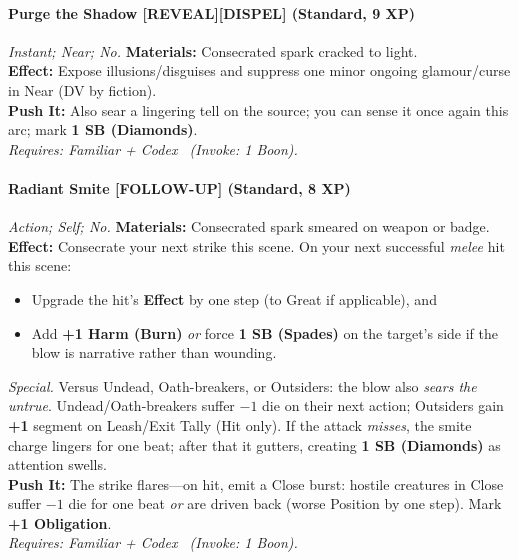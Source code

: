 \paragraph{Purge the Shadow \textnormal{[REVEAL][DISPEL]} (Standard, 9 XP)} \emph{Instant; Near; No.}
\textbf{Materials:} Consecrated spark cracked to light.\\
\textbf{Effect:} Expose illusions/disguises and suppress one minor ongoing glamour/curse in Near (DV by fiction).\\
\textbf{Push It:} Also sear a lingering tell on the source; you can sense it once again this arc; mark \textbf{1 SB (Diamonds)}.\\
\emph{Requires: Familiar + Codex \ (\textit{Invoke:} 1 Boon).}

\paragraph{Radiant Smite \textnormal{[FOLLOW-UP]} (Standard, 8 XP)} \emph{Action; Self; No.}
\textbf{Materials:} Consecrated spark smeared on weapon or badge.\\
\textbf{Effect:} Consecrate your next strike this scene. On your next successful \emph{melee} hit this scene:
\begin{itemize}
  \item Upgrade the hit's \textbf{Effect} by one step (to Great if applicable), and
  \item Add \textbf{+1 Harm (Burn)} \emph{or} force \textbf{1 SB (Spades)} on the target's side if the blow is narrative rather than wounding.
\end{itemize}
\textit{Special.} Versus Undead, Oath-breakers, or Outsiders: the blow also \emph{sears the untrue}. Undead/Oath-breakers suffer \(-1\) die on their next action; Outsiders gain \textbf{+1} segment on Leash/Exit Tally (Hit only). If the attack \emph{misses}, the smite charge lingers for one beat; after that it gutters, creating \textbf{1 SB (Diamonds)} as attention swells.\\
\textbf{Push It:} The strike flares—on hit, emit a Close burst: hostile creatures in Close suffer \(-1\) die for one beat \emph{or} are driven back (worse Position by one step). Mark \textbf{+1 Obligation}.\\
\emph{Requires: Familiar + Codex \ (\textit{Invoke:} 1 Boon).}


